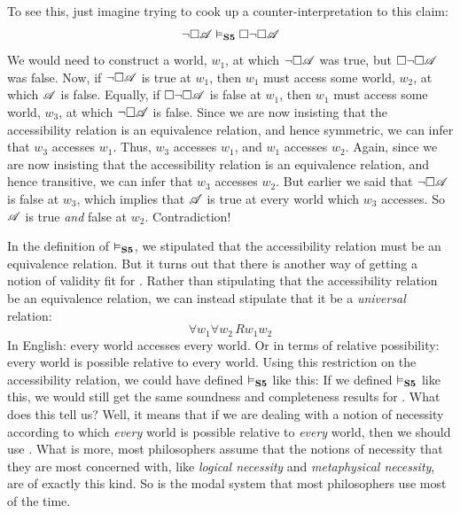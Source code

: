 To see this, just imagine trying to cook up a counter-interpretation to this claim:
\[
	\neg\Box\mathscr{A} \vDash_{\mathbf{S5}}  \Box \neg\Box \mathscr{A}
\]
We would need to construct a world, $w_1$, at which $\neg\Box\mathscr{A}$ was true, but $\Box \neg\Box \mathscr{A}$ was false.
Now, if $\neg\Box\mathscr{A}$ is true at $w_1$, then $w_1$ must access some world, $w_2$, at which $\mathscr{A}$ is false. Equally, if $\Box \neg\Box \mathscr{A}$ is false at $w_1$, then $w_1$ must access some world, $w_3$, at which $\neg\Box \mathscr{A}$ is false. Since we are now insisting that the accessibility relation is an equivalence relation, and hence symmetric, we can infer that $w_3$ accesses $w_1$. Thus, $w_3$ accesses $w_1$, and $w_1$ accesses $w_2$. Again, since we are now insisting that the accessibility relation is an equivalence relation, and hence transitive, we can infer that $w_3$ accesses $w_2$. But earlier we said that $\neg\Box \mathscr{A}$ is false at $w_3$, which implies that $\mathscr{A}$ is true at every world which $w_3$ accesses. So $\mathscr{A}$ is true \emph{and} false at $w_2$. Contradiction!

In the definition of $\vDash_{\mathbf{S5}} $, we stipulated that the accessibility relation must be an equivalence relation. But it turns out that there is another way of getting a notion of validity fit for \mlSfive. Rather than stipulating that the accessibility relation be an equivalence relation, we can instead stipulate that it be a \emph{universal} relation:
\[\forall w_1\forall w_2\, Rw_1w_2\]
In English: every world accesses every world. Or in terms of relative possibility: every world is possible relative to every world. Using this restriction on the accessibility relation, we could have defined $\vDash_{\mathbf{S5}} $ like this:
If we defined $\vDash_{\mathbf{S5}} $ like this, we would still get the same soundness and completeness results for \mlSfive. What does this tell us? Well, it means that if we are dealing with a notion of necessity according to which \emph{every} world is possible relative to \emph{every} world, then we should use \mlSfive. What is more, most philosophers assume that the notions of necessity that they are most concerned with, like \emph{logical necessity} and \emph{metaphysical necessity}, are of exactly this kind. So \mlSfive{} is the modal system that most philosophers use most of the time.

